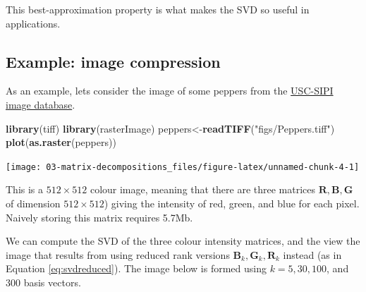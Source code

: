 \documentclass[
]{book}
\newenvironment{Shaded}{\begin{snugshade}}{\end{snugshade}}
\newcommand{\FunctionTok}[1]{\textcolor[rgb]{0.13,0.29,0.53}{\textbf{#1}}}
\newcommand{\NormalTok}[1]{#1}
\newcommand{\OtherTok}[1]{\textcolor[rgb]{0.56,0.35,0.01}{#1}}
\newcommand{\StringTok}[1]{\textcolor[rgb]{0.31,0.60,0.02}{#1}}
\theoremstyle{definition}
\theoremstyle{definition}
\theoremstyle{definition}
\theoremstyle{definition}
\theoremstyle{remark}
\begin{document}
This best-approximation property is what makes the SVD so useful in applications.

\hypertarget{example-image-compression}{%
\subsection{Example: image compression}\label{example-image-compression}}

As an example, lets consider the image of some peppers from the \href{http://sipi.usc.edu/database/}{USC-SIPI image database}.

\begin{Shaded}
\begin{Highlighting}[]
\FunctionTok{library}\NormalTok{(tiff)}
\FunctionTok{library}\NormalTok{(rasterImage)}
\NormalTok{peppers}\OtherTok{\textless{}{-}}\FunctionTok{readTIFF}\NormalTok{(}\StringTok{"figs/Peppers.tiff"}\NormalTok{)}
\FunctionTok{plot}\NormalTok{(}\FunctionTok{as.raster}\NormalTok{(peppers))}
\end{Highlighting}
\end{Shaded}

\texttt{[image: 03-matrix-decompositions\_files/figure-latex/unnamed-chunk-4-1]}

This is a \(512 \times 512\) colour image, meaning that there are three matrices \(\mathbf R, \mathbf B,\mathbf G\) of dimension \(512\times 512\)) giving the intensity of red, green, and blue for each pixel.
Naively storing this matrix requires 5.7Mb.

We can compute the SVD of the three colour intensity matrices, and the view the image that results from using reduced rank versions \(\mathbf B_k, \mathbf G_k, \mathbf R_k\) instead (as in Equation \eqref{eq:svdreduced}). The image below is formed using \(k=5, 30, 100\), and \(300\) basis vectors.
\end{document}
